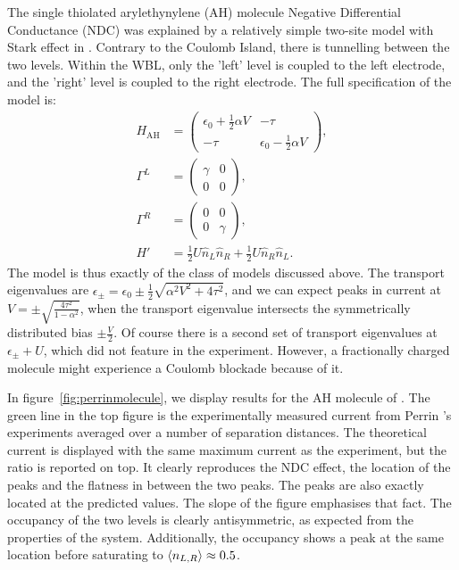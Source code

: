 \documentclass{article}
\begin{document}
\begin{multicols}{2}
        The single thiolated arylethynylene (AH) molecule Negative Differential Conductance (NDC) was explained by a relatively simple two-site model with Stark effect in \citet{perrinnano}. Contrary to the Coulomb Island, there is tunnelling between the two levels. Within the WBL, only the 'left' level is coupled to the left electrode, and the 'right' level is coupled to the right electrode. The full specification of the model is:
        \begin{align*}
            H_\text{AH} &= \begin{pmatrix} \epsilon_0 + \frac{1}{2}\alpha V & -\tau \\-\tau &  \epsilon_0 - \frac{1}{2} \alpha V\end{pmatrix}, \\
            \Gamma^L &= \begin{pmatrix} \gamma & 0 \\ 0 & 0 \end{pmatrix} ,\\
            \Gamma^R &= \begin{pmatrix} 0 & 0 \\ 0 & \gamma \end{pmatrix} ,\\
            H' &= \frac{1}{2} U \hat{n}_L \hat{n}_R + \frac{1}{2} U \hat{n}_R \hat{n}_L.
        \end{align*}
        The model is thus exactly of the class of models discussed above. The transport eigenvalues are $\epsilon_\pm = \epsilon_0 \pm \frac{1}{2} \sqrt{\alpha^2 V^2 + 4\tau^2}$, and we can expect peaks in current at $V = \pm \sqrt{ \frac{4\tau^2}{1-\alpha^2}}$, when the transport eigenvalue intersects the symmetrically distributed bias $\pm \frac{V}{2}$. Of course there is a second set of transport eigenvalues at $\epsilon_\pm + U$, which did not feature in the experiment. However, a fractionally charged molecule might experience a Coulomb blockade because of it.
        
        In figure~\ref{fig:perrinmolecule}, we display results for the AH molecule of \citet{perrinnano}. The green line in the top figure is the experimentally measured current from Perrin 's experiments averaged over a number of separation distances. The theoretical current is displayed with the same maximum current as the experiment, but the ratio is reported on top. It clearly reproduces the NDC effect, the location of the peaks and the flatness in between the two peaks. The peaks are also exactly located at the predicted values. The slope of the figure emphasises that fact. The occupancy of the two levels is clearly antisymmetric, as expected from the properties of the system. Additionally, the occupancy shows a peak at the same location before saturating to $\braket{n_{L,R}}\approx0.5$.
    

\end{multicols}
\end{document}
